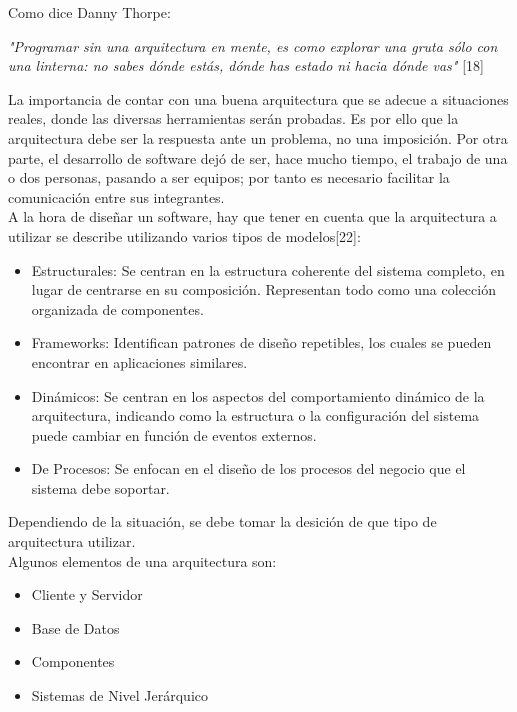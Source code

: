 Como dice Danny Thorpe:
\begin{center}
 \textit{"Programar sin una arquitectura en mente, es como explorar una gruta sólo con una
 linterna: no sabes dónde estás, dónde has estado ni hacia dónde vas"} [18]
\end{center}
La importancia de contar con una buena arquitectura que se adecue a situaciones reales, donde 
las diversas herramientas serán probadas. Es por ello que la arquitectura debe ser la respuesta 
ante un problema, no una imposición. Por otra parte, el desarrollo de software dejó de ser, hace mucho
tiempo, el trabajo de una o dos personas, pasando a ser equipos; por tanto es necesario facilitar la
comunicación entre sus integrantes.\\

A la hora de diseñar un software, hay que tener en cuenta que la arquitectura a utilizar se 
describe utilizando varios tipos de modelos[22]:
\begin{itemize}
 \item Estructurales: Se centran en la estructura coherente del sistema completo, en lugar de centrarse 
  en su composición. Representan todo como una colección organizada de componentes. 
 \item Frameworks: Identifican patrones de diseño repetibles, los cuales se pueden encontrar en aplicaciones
  similares.
 \item Dinámicos: Se centran en los aspectos del comportamiento dinámico de la arquitectura,  indicando
  como la estructura o la configuración del sistema puede cambiar en función de eventos externos.
 \item De Procesos: Se enfocan en el diseño de los procesos del negocio que el sistema debe soportar.
\end{itemize}

Dependiendo de la situación, se debe tomar la desición de que tipo de arquitectura utilizar.\\



Algunos elementos de una arquitectura son:
\begin{itemize}
 \item Cliente y Servidor
 \item Base de Datos
 \item Componentes
 \item Sistemas de Nivel Jerárquico
\end{itemize}


